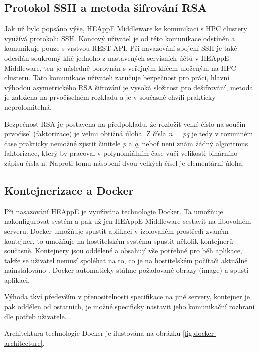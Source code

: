 \newpage

\subsection{Protokol SSH a metoda šifrování RSA}
Jak už bylo popsáno výše, HEAppE Middleware ke komunikaci s HPC clustery využívá protokolu SSH. Koncový uživatel je od této komunikace odstíněn a komunikuje pouze s vrstvou REST API. Při navazování spojení SSH je také odesílán soukromý klíč jednoho z nastavených servisních účtů v HEAppE Middleware, ten je následně porovnán s veřejným klíčem uloženým na HPC clusteru. Tato komunikace uživateli zaručuje bezpečnost pro práci, hlavní výhodou asymetrického RSA šifrování je vysoká složitost pro dešifrování, metoda je založena na prvočíselném rozkladu a je v současné chvíli prakticky neprolomitelná.

Bezpečnost RSA je postavena na předpokladu, že rozložit velké číslo na součin prvočísel (faktorizace) je velmi obtížná úloha. Z čísla \emph{n = pq} je tedy v rozumném čase prakticky nemožné zjistit činitele \emph{p} a \emph{q}, neboť není znám žádný algoritmus faktorizace, který by pracoval v polynomiálním čase vůči velikosti binárního zápisu čísla n. Naproti tomu násobení dvou velkých čísel je elementární úloha.\cite{GqNaOav5DExhzgW6}

\subsection{Kontejnerizace a Docker}
Při nasazování HEAppE je využívána technologie Docker. Ta umožňuje nakonfigurovat systém a pak už jen HEAppE Middleware sestavit na libovolném serveru. Docker umožňuje spustit aplikaci v izolovaném prostředí zvaném kontejner, to umožňuje na hostitelském systému spustit několik kontejnerů současně. Kontejnery jsou oddělené a obsahují vše potřebné pro běh aplikace, takže se uživatel nemusí spoléhat na to, co je na hostitelském počítači aktuálně nainstalováno \cite{Ued4tuEOQL0cOIeN}. Docker automaticky stáhne požadované obrazy (image) a spustí aplikaci. 

Výhoda tkví především v přenositelnosti specifikace na jiné servery, kontejner je pak oddělen od ostatních, je možné specificky nastavit jeho komunikační rozhraní dle potřeb uživatele.

Architektura technologie Docker je ilustována na obrázku \ref{fig:docker-architecture}.

